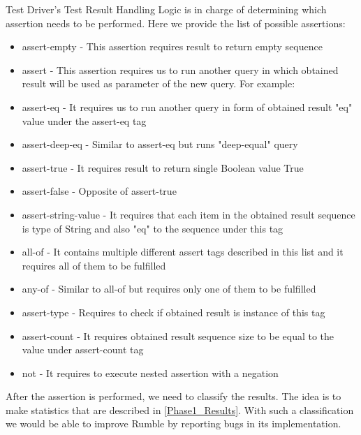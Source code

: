 Test Driver's Test Result Handling Logic is in charge of determining which assertion needs to be performed. Here we provide the list of possible assertions:

\begin{itemize}
	\item assert-empty - This assertion requires result to return empty sequence
	\item assert - This assertion requires us to run another query in which obtained result will be used as parameter of the new query. For example:
	
	\item assert-eq - It requires us to run another query in form of obtained result "eq" value under the assert-eq tag
	\item assert-deep-eq - Similar to assert-eq but runs "deep-equal" query
	\item assert-true - It requires result to return single Boolean value True
	\item assert-false - Opposite of assert-true
	\item assert-string-value - It requires that each item in the obtained result sequence is type of String and also "eq" to the sequence under this tag
	\item all-of - It contains multiple different assert tags described in this list and it requires all of them to be fulfilled 
	\item any-of - Similar to all-of but requires only one of them to be fulfilled
	\item assert-type - Requires to check if obtained result is instance of this tag
	\item assert-count - It requires obtained result sequence size to be equal to the value under assert-count tag
	\item not - It requires to execute nested assertion with a negation
\end{itemize}

After the assertion is performed, we need to classify the results. The idea is to make statistics that are described in \ref{Phase1_Results}. With such a classification we would be able to improve Rumble by reporting bugs in its implementation.

